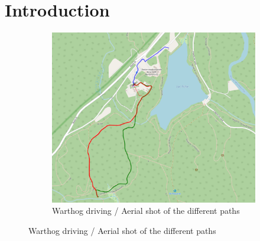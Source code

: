 \section{Introduction}
\label{sec:intro}

\lightlipsum[1]

\begin{figure} [h]
	\begin{center}
	\begin{subfigure} [b] {0.4\textwidth}
		\includegraphics[width=\linewidth]{figs/fm_paths.pdf}
		\caption{Warthog driving / Aerial shot of the different paths}
		\label{fig:front_fig}
	\end{subfigure}
	\end{center}
\end{figure}

\lightlipsum[1]
\lightlipsum[1]
\lightlipsum[1]
